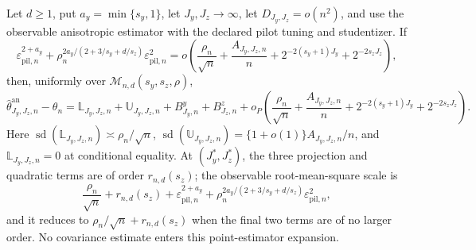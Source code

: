 Let \(d\ge1\), put \(a_y=\min\{s_y,1\}\), let \(J_y,J_z\to\infty\), let \(D_{J_y,J_z}=o(n^2)\), and use the observable anisotropic estimator with the declared pilot tuning and studentizer. If
\[
\varepsilon_{\mathrm{pil},n}^{2+a_y}+\rho_n^{2a_y/(2+3/s_y+d/s_z)}\varepsilon_{\mathrm{pil},n}^2
=o\!\left(\frac{\rho_n}{\sqrt n}+\frac{A_{J_y,J_z,n}}n+2^{-2(s_y+1)J_y}+2^{-2s_zJ_z}\right),
\]
then, uniformly over \(\mathcal M_{n,d}(s_y,s_z,\rho)\),
\[
\widehat\theta^{\mathrm{an}}_{J_y,J_z,n}-\theta_n=\mathbb L_{J_y,J_z,n}+\mathbb U_{J_y,J_z,n}+B^y_{J_y,n}+B^z_{J_z,n}+o_P\!\left(\frac{\rho_n}{\sqrt n}+\frac{A_{J_y,J_z,n}}n+2^{-2(s_y+1)J_y}+2^{-2s_zJ_z}\right).
\]
Here \(\operatorname{sd}(\mathbb L_{J_y,J_z,n})\asymp\rho_n/\sqrt n\), \(\operatorname{sd}(\mathbb U_{J_y,J_z,n})=\{1+o(1)\}A_{J_y,J_z,n}/n\), and \(\mathbb L_{J_y,J_z,n}=0\) at conditional equality. At \((J_y^*,J_z^*)\), the three projection and quadratic terms are of order \(r_{n,d}(s_z)\); the observable root-mean-square scale is
\[
\frac{\rho_n}{\sqrt n}+r_{n,d}(s_z)+\varepsilon_{\mathrm{pil},n}^{2+a_y}+\rho_n^{2a_y/(2+3/s_y+d/s_z)}\varepsilon_{\mathrm{pil},n}^2,
\]
and it reduces to \(\rho_n/\sqrt n+r_{n,d}(s_z)\) when the final two terms are of no larger order. No covariance estimate enters this point-estimator expansion.